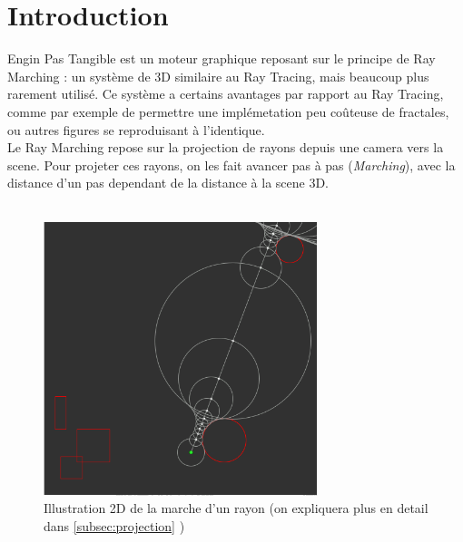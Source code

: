 \section{Introduction}

    Engin Pas Tangible est un moteur graphique reposant sur le principe de Ray Marching : un système de 3D similaire au Ray Tracing, mais beaucoup plus rarement utilisé. Ce système a certains avantages par rapport au Ray Tracing, comme par exemple de permettre une implémetation peu coûteuse de fractales, ou autres figures se reproduisant à l'identique. \\
    Le Ray Marching repose sur la projection de rayons depuis une camera vers la scene. Pour projeter ces rayons, on les fait avancer pas à pas (\emph{Marching}), avec la distance d'un pas dependant de la distance à la scene 3D.
\\
\\
\begin{figure}[h]
    \centering
    \includegraphics[width=8cm]{images/marching.png}
    \caption{Illustration 2D de la marche d'un rayon (on expliquera plus en detail dans \ref{subsec:projection} )}
    \label{fig:my_label}
\end{figure}
